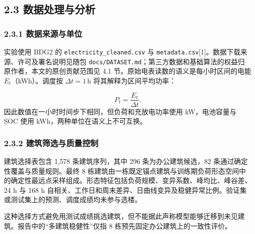 \documentclass[12pt,a4paper]{article}
\begin{document}
\subsection{2.3 数据处理与分析}
\subsubsection{2.3.1 数据来源与单位}
实验使用 BDG2 的 \nolinkurl{electricity_cleaned.csv} 与 \nolinkurl{metadata.csv}[1]。数据下载来源、许可及署名说明见随包 \nolinkurl{docs/DATASET.md}；第三方数据和基础算法的权益归原作者，本文的原创贡献范围见 4.1 节。原始电表读数的语义是每小时区间的电能 \(E_t\)（kWh）。调度按 \(\Delta t=1\,\text{h}\) 将其解释为区间平均功率：\par
\[
P_t = \frac{E_t}{\Delta t}.
\]
因此数值在一小时时间步下相同，但负荷和充放电功率使用 kW，电池容量与 SOC 使用 kWh，两种单位在语义上不可互换。\par
\subsubsection{2.3.2 建筑筛选与质量控制}
建筑选择表包含 1,578 条建筑序列，其中 296 条为办公建筑候选，82 条通过确定性覆盖与质量规则。最终 8 栋建筑由一栋既定锚点建筑与训练期负荷形态空间中的确定性最远点采样组成。形态特征包括负荷规模、变异系数、峰均比、峰谷差、24 h 与 168 h 自相关、工作日和周末差异、日曲线变异及稳健异常比例。验证集或测试集上的预测、调度成绩均未参与选楼。\par
这种选择方式避免用测试成绩挑选建筑，但不能据此声称模型能够迁移到未见建筑。报告中的“多建筑稳健性”仅指 8 栋预先固定办公建筑上的一致性评价。\par
\end{document}
